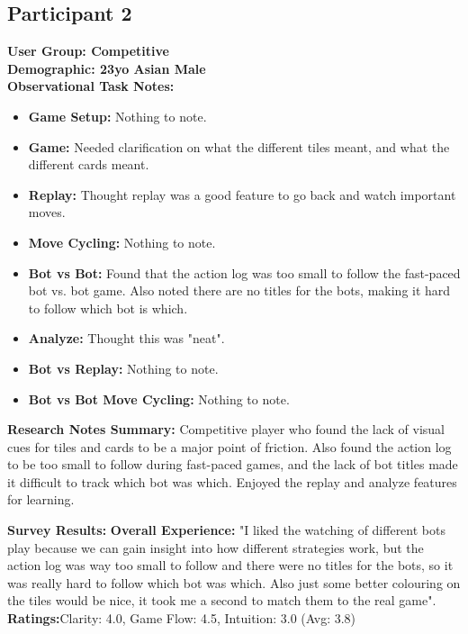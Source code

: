 \documentclass[12pt]{article}
\begin{document}
\subsection{Participant 2}
\textbf {User Group: Competitive} \\
\textbf {Demographic: 23yo Asian Male} \\
\textbf{Observational Task Notes:}
\begin{itemize}
    \item \textbf{Game Setup:} Nothing to note.
    \item \textbf{Game:} Needed clarification on what the different tiles meant, and what the different cards meant. 
    \item \textbf{Replay:} Thought replay was a good feature to go back and watch important moves.
    \item \textbf{Move Cycling:} Nothing to note.
    \item \textbf{Bot vs Bot:} Found that the action log was too small to follow the fast-paced bot vs. bot game. Also noted there are no titles for the bots, making it hard to follow which bot is which.
    \item \textbf{Analyze:} Thought this was "neat".
    \item \textbf{Bot vs Replay:} Nothing to note.
    \item \textbf{Bot vs Bot Move Cycling:} Nothing to note.
\end{itemize}
\textbf{Research Notes Summary:} Competitive player who found the lack of visual cues for tiles and cards to be a major point of friction. Also found the action log to be too small to follow during fast-paced games, and the lack of bot titles made it difficult to track which bot was which. Enjoyed the replay and analyze features for learning.

\textbf{Survey Results:} 
\subitem \textbf{Overall Experience:} "I liked the watching of different bots play because we can gain insight into how different strategies work, but the action log was way too small to follow and there were no titles for the bots, so it was really hard to follow which bot was which. Also just some better colouring on the tiles would be nice, it took me a second to match them to the real game".
\subitem \textbf{Ratings:}Clarity: 4.0, Game Flow: 4.5, Intuition: 3.0 (Avg: 3.8)

\end{document}

